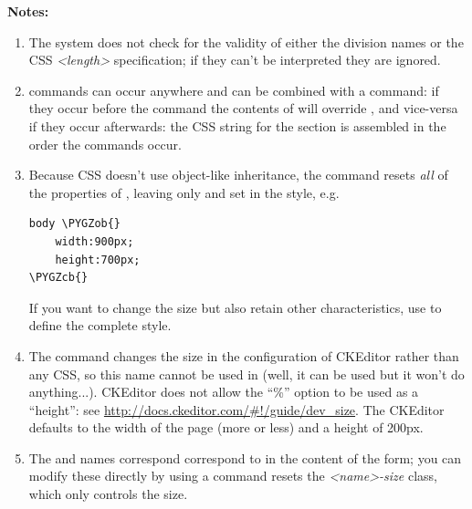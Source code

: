 \documentclass[letterpaper,10pt,english]{sphinxmanual}
\def\PYGZob{\char`\{}
\def\PYGZcb{\char`\}}
\begin{document}
\textbf{Notes:}
\begin{enumerate}
\item {} 
The system does not check for the validity of either the division names or the
CSS \emph{\textless{}length\textgreater{}} specification; if they can't be interpreted
they are ignored.

\item {} 
 commands can occur anywhere and can be combined with a  command:
if they occur before the  command the contents of  will override ,
and vice-versa if they occur afterwards: the CSS string for the
 section is assembled in the order the commands occur.

\item {} 
Because CSS doesn't use object-like inheritance, the   command resets
\emph{all} of the properties of , leaving only  and  set in the style, e.g.

\begin{Verbatim}[commandchars=\\\{\}]
body \PYGZob{}
    width:900px;
    height:700px;
\PYGZcb{}
\end{Verbatim}

If you want to change the size but also retain other characteristics, use 
to define the complete  style.

\item {} 
The  command changes the size in the configuration of CKEditor rather than
any CSS, so this name cannot be used in   (well, it can be used but it won't
do anything...). CKEditor does not allow the “\%” option to be used as a “height”:
see \href{http://docs.ckeditor.com/\#!/guide/dev\_size}{http://docs.ckeditor.com/\#!/guide/dev\_size}. The CKEditor defaults to the width
of the page (more or less) and a height of 200px.

\item {} 
The   and  names correspond correspond to 
in the content of the form; you can modify these directly by using a  command resets the \emph{\textless{}name\textgreater{}-size} class, which only controls the size.

\end{enumerate}
\end{document}
